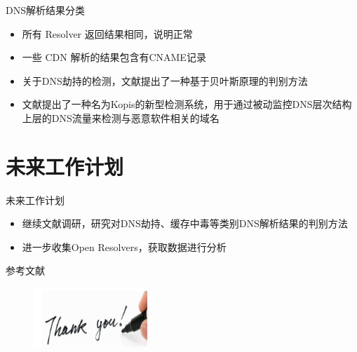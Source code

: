\documentclass{beamer}
\begin{document}
\begin{frame}{DNS解析结果分类}

  \begin{itemize}
    \item 所有 Resolver 返回结果相同，说明正常
    \item 一些 CDN 解析的结果包含有CNAME记录
    \item 关于DNS劫持的检测，文献\cite{Yan2006}提出了一种基于贝叶斯原理的判别方法
    \item 文献\cite{Antonakakis2011}提出了一种名为Kopis的新型检测系统，用于通过被动监控DNS层次结构上层的DNS流量来检测与恶意软件相关的域名
  \end{itemize}

\end{frame}

\section{未来工作计划}

\begin{frame}{未来工作计划}

  \begin{itemize}
    \item 继续文献调研，研究对DNS劫持、缓存中毒等类别DNS解析结果的判别方法
    \item 进一步收集Open Resolvers，获取数据进行分析
  \end{itemize}

\end{frame}


 \begin{frame}{参考文献}
  \scriptsize
  
\end{frame}

\begin{frame}
  \begin{figure}
    \includegraphics[height=2.23cm,width=4.29cm]{images/thank.jpg}
  \end{figure} 
\end{frame}
\end{document}
